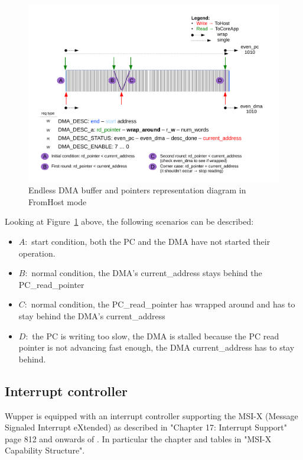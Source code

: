 \begin{figure}[H]
	\centering
	\includegraphics[width=1\textwidth, page=2]{figures/Endless_DMA_diagram.pdf}
	\caption{Endless DMA buffer and pointers representation diagram in FromHost mode}
	\label{fig:endless_dma_diagram_fromhost}
\end{figure}
Looking at Figure~\ref{fig:endless_dma_diagram_fromhost} above, the following scenarios can be described:
\begin{itemize}
	\item $A:$ start condition, both the PC and the DMA have not started their operation.
	\item $B:$ normal condition, the DMA's current\_address stays behind the PC\_read\_pointer 
	\item $C:$ normal condition, the PC\_read\_pointer has wrapped around and has to stay behind the DMA's current\_address 
	\item $D:$ the PC is writing too slow, the DMA is stalled because the PC read pointer is not advancing fast enough, the DMA current\_address has to stay behind.
\end{itemize}

\newpage
\subsection{Interrupt controller}
\label{sec:interrupt_controller}

Wupper is equipped with an interrupt controller supporting the MSI-X (Message Signaled Interrupt eXtended) as described in "Chapter 17: Interrupt Support" page 812 and onwards of \cite{PCIe_technology}. In particular the chapter and tables in "MSI-X Capability Structure". 

